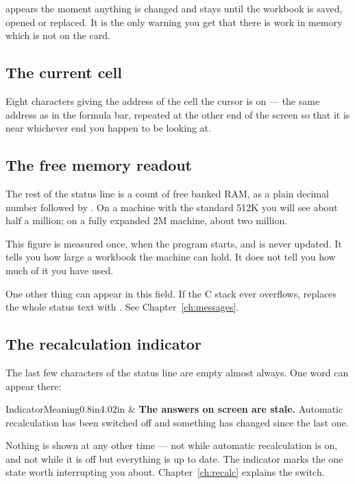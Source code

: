  appears the moment anything is changed and stays until the workbook
is saved, opened or replaced. It is the only warning you get that there is work
in memory which is not on the card.

\subsection{The current cell}

Eight characters giving the address of the cell the cursor is on --- the same
address as in the formula bar, repeated at the other end of the screen so that
it is near whichever end you happen to be looking at.

\subsection{The free memory readout}

The rest of the status line is a count of free banked RAM, as a plain decimal
number followed by . On a machine with the standard 512K you
will see about half a million; on a fully expanded 2M machine, about two
million.

\begin{ccnote}
This figure is measured once, when the program starts, and is never updated.
It tells you how large a workbook the machine can hold. It does not tell you
how much of it you have used.
\end{ccnote}

One other thing can appear in this field. If the C stack ever overflows,
\ccprod{} replaces the whole status text with . See
Chapter~\ref{ch:messages}.

\subsection{The recalculation indicator}

The last few characters of the status line are empty almost always. One word can
appear there:

\begin{cctable}{Indicator}{Meaning}{0.8in}{4.02in}
 & \textbf{The answers on screen are stale.} Automatic recalculation
has been switched off and something has changed since the last one. \\
\end{cctable}

Nothing is shown at any other time --- not while automatic recalculation is on,
and not while it is off but everything is up to date. The indicator marks the
one state worth interrupting you about. Chapter~\ref{ch:recalc} explains the
switch.


